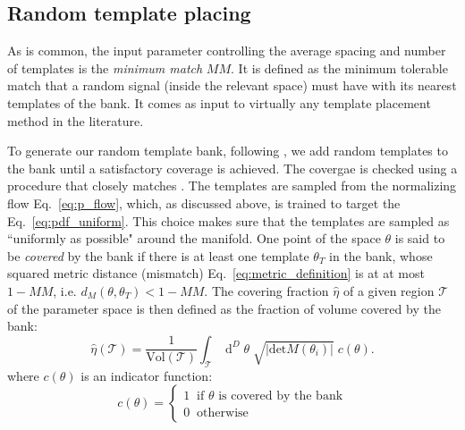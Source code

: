 \documentclass[twocolumn,showpacs,preprintnumbers,nofootinbib,prd,
superscriptaddress,10pt]{revtex4-2}
\newcommand{\dvol}[2]{\ensuremath{\operatorname{d}^{#2}\!{#1}}}
\begin{document}
\subsection{Random template placing} \label{sec:template_placing}

As is common, the input parameter controlling the average spacing and number of templates is the {\it minimum match} $MM$. It is defined as the minimum tolerable match that a random signal (inside the relevant space) must have with its nearest templates of the bank. It comes as input to virtually any template placement method in the literature.

To generate our random template bank, following \cite{Messenger:2008ta}, we add random templates to the bank until a satisfactory coverage is achieved. The covergae is checked using a procedure that closely matches \cite{Coogan:2022qxs}.
The templates are sampled from the normalizing flow Eq.~\eqref{eq:p_flow}, which, as discussed above, is trained to target the Eq.~\eqref{eq:pdf_uniform}. This choice makes sure that the templates are sampled as ``uniformly as possible" around the manifold.
One point of the space $\theta$ is said to be {\it covered} by the bank if there is at least one template $\theta_T$ in the bank, whose squared metric distance (mismatch) Eq.~\eqref{eq:metric_definition} is at at most $1 - MM$, i.e. $d_M(\theta, \theta_T)<1 - MM$.
The covering fraction $\hat{\eta}$ of a given region $\mathcal{T}$ of the parameter space is then defined as the fraction of volume covered by the bank:
\begin{equation}\label{eq:coverage}
	\hat{\eta}(\mathcal{T}) = \frac{1}{\text{Vol}(\mathcal{T})} \int_\mathcal{T} \dvol{\theta}{D} \; \sqrt{|\text{det}M(\theta_i)|} \; c(\theta).
\end{equation}
where $c(\theta)$ is an indicator function:
\begin{equation}\label{eq:coverage}
	c(\theta) = \left\{
                \begin{array}{ll}
                  1 \;\; \text{if $\theta$ is covered by the bank}\\
                  0 \;\; \text{otherwise}
                \end{array}
              \right.
\end{equation}
\end{document}
